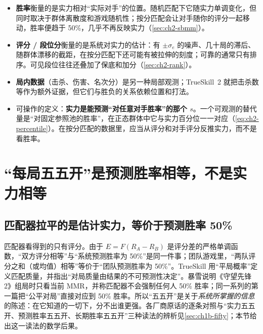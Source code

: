 \begin{keybox}[为什么胜率和分数都只体现一部分实力]
\begin{itemize}
\item \textbf{胜率}衡量的是实力相对“实际对手”的位置。随机匹配下它随实力单调变化，但同时取决于群体离散度和游戏随机性；按分匹配会让对手随你的评分一起移动，胜率便趋于 50\%，几乎不再反映实力（\cref{sec:ch2-sbmm}）。
\item \textbf{评分 / 段位分}衡量的是系统对实力的估计：有 $\pm\sigma_e$ 的噪声、几十局的滞后、随群体漂移的截距，在按分匹配下还可能有被拉伸的刻度；可靠的通常只有排序。可见段位往往还叠加了保底和加分（\cref{sec:ch2-rank}）。
\item \textbf{局内数据}（击杀、伤害、名次分）是另一种局部观测；TrueSkill~2 就把击杀数等作为额外证据\cite{minka2018trueskill}\tagLit，但它们与胜负的关系依赖位置和打法。
\item 可操作的定义：\textbf{实力是能预测“对任意对手胜率”的那个 $s$}。一个可观测的替代量是“对固定参照池的胜率”，在正态群体中它与实力百分位一一对应（\cref{eq:ch2-percentile}）。在按分匹配的数据里，应当从评分和对手评分反推实力，而不是看胜率。
\end{itemize}
\end{keybox}

\section{“每局五五开”是预测胜率相等，不是实力相等}
\label{sec:ch2-fair}

\subsection{匹配器拉平的是估计实力，等价于预测胜率 50\%}

匹配器看得到的只有评分。由于 $E=F(R_A-R_B)$ 是评分差的严格单调函数，“双方评分相等”与“系统预测胜率为 50\%”是同一件事；团队游戏里，“两队评分之和（或均值）相等”等价于“团队预测胜率为 50\%”。TrueSkill 用“平局概率”定义匹配质量，并指出“对局质量由结果的不可预测性决定”\cite{herbrich2006trueskill}\tagLit。暴雪说明《守望先锋 2》组局时只看当前 MMR，并称匹配器不会强制任何人 50\% 胜率\cite{blizzard2023overwatch}\tagOff；同一系列的第一篇把“公平对局”直接对应到 50\% 胜率\cite{blizzard2022overwatch}\tagOff。所以“五五开”是关于\emph{系统所掌握的信息}的陈述：在它知道的一切下，分不出谁更强。各厂商原话的逐条对照与“实力五五开、预测胜率五五开、长期胜率五五开”三种读法的辨析见\cref{sec:ch1b-fifty}；本节给出这一读法的数学后果。


